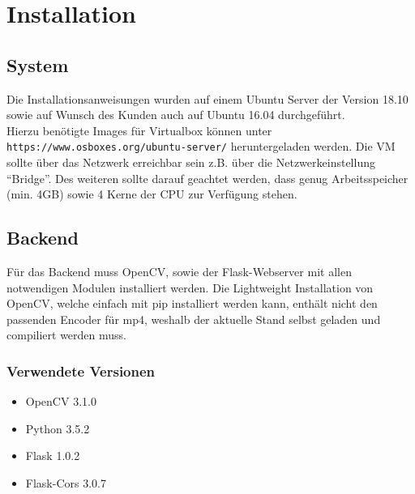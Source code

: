 \chapter{Installation}
\label{chapter_installation}

\section{System}
Die Installationsanweisungen wurden auf einem Ubuntu Server der Version 18.10 sowie auf Wunsch des Kunden auch auf Ubuntu 16.04 durchgeführt.\\
Hierzu benötigte Images für Virtualbox können unter \\ \texttt{https://www.osboxes.org/ubuntu-server/} heruntergeladen werden.
Die VM sollte über das Netzwerk erreichbar sein z.B. über die Netzwerkeinstellung \enquote{Bridge}.
Des weiteren sollte darauf geachtet werden, dass genug Arbeitsspeicher (min. 4GB) sowie 4 Kerne der CPU zur Verfügung stehen.

\section{Backend}
Für das Backend muss OpenCV, sowie der Flask-Webserver mit allen notwendigen Modulen installiert werden.
Die Lightweight Installation von OpenCV, welche einfach mit pip installiert werden kann, enthält nicht den passenden Encoder für mp4, weshalb der aktuelle Stand selbst geladen und compiliert werden muss.
\subsection{Verwendete Versionen}
\begin{itemize}
	\item OpenCV 3.1.0
	\item Python 3.5.2
	\item Flask 1.0.2
	\item Flask-Cors 3.0.7
\end{itemize}

